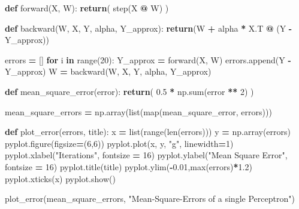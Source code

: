 \documentclass[
]{book}
\newenvironment{Shaded}{\begin{snugshade}}{\end{snugshade}}
\newcommand{\BuiltInTok}[1]{#1}
\newcommand{\ControlFlowTok}[1]{\textcolor[rgb]{0.13,0.29,0.53}{\textbf{#1}}}
\newcommand{\DecValTok}[1]{\textcolor[rgb]{0.00,0.00,0.81}{#1}}
\newcommand{\FloatTok}[1]{\textcolor[rgb]{0.00,0.00,0.81}{#1}}
\newcommand{\KeywordTok}[1]{\textcolor[rgb]{0.13,0.29,0.53}{\textbf{#1}}}
\newcommand{\NormalTok}[1]{#1}
\newcommand{\OperatorTok}[1]{\textcolor[rgb]{0.81,0.36,0.00}{\textbf{#1}}}
\newcommand{\StringTok}[1]{\textcolor[rgb]{0.31,0.60,0.02}{#1}}
\begin{document}
\begin{Shaded}
\begin{Highlighting}[]
\KeywordTok{def}\NormalTok{ forward(X, W):}
  \ControlFlowTok{return}\NormalTok{( step(X }\OperatorTok{@}\NormalTok{ W) )}

\KeywordTok{def}\NormalTok{ backward(W, X, Y, alpha, Y\_approx):}
    \ControlFlowTok{return}\NormalTok{(W }\OperatorTok{+}\NormalTok{ alpha }\OperatorTok{*}\NormalTok{ X.T }\OperatorTok{@}\NormalTok{ (Y }\OperatorTok{{-}}\NormalTok{ Y\_approx))}
  
  
\NormalTok{errors }\OperatorTok{=}\NormalTok{ []}
\ControlFlowTok{for}\NormalTok{ i }\KeywordTok{in} \BuiltInTok{range}\NormalTok{(}\DecValTok{20}\NormalTok{):}
\NormalTok{  Y\_approx }\OperatorTok{=}\NormalTok{ forward(X, W)}
\NormalTok{  errors.append(Y }\OperatorTok{{-}}\NormalTok{ Y\_approx)}
\NormalTok{  W }\OperatorTok{=}\NormalTok{ backward(W, X, Y, alpha, Y\_approx)}
  
  
  
\KeywordTok{def}\NormalTok{ mean\_square\_error(error):}
  \ControlFlowTok{return}\NormalTok{( }\FloatTok{0.5} \OperatorTok{*}\NormalTok{ np.}\BuiltInTok{sum}\NormalTok{(error }\OperatorTok{**} \DecValTok{2}\NormalTok{) )}


\NormalTok{mean\_square\_errors }\OperatorTok{=}\NormalTok{ np.array(}\BuiltInTok{list}\NormalTok{(}\BuiltInTok{map}\NormalTok{(mean\_square\_error, errors)))}


\KeywordTok{def}\NormalTok{ plot\_error(errors, title):}
\NormalTok{  x }\OperatorTok{=} \BuiltInTok{list}\NormalTok{(}\BuiltInTok{range}\NormalTok{(}\BuiltInTok{len}\NormalTok{(errors)))}
\NormalTok{  y }\OperatorTok{=}\NormalTok{ np.array(errors)}
\NormalTok{  pyplot.figure(figsize}\OperatorTok{=}\NormalTok{(}\DecValTok{6}\NormalTok{,}\DecValTok{6}\NormalTok{))}
\NormalTok{  pyplot.plot(x, y, }\StringTok{"g"}\NormalTok{, linewidth}\OperatorTok{=}\DecValTok{1}\NormalTok{)}
\NormalTok{  pyplot.xlabel(}\StringTok{"Iterations"}\NormalTok{, fontsize }\OperatorTok{=} \DecValTok{16}\NormalTok{)}
\NormalTok{  pyplot.ylabel(}\StringTok{"Mean Square Error"}\NormalTok{, fontsize }\OperatorTok{=} \DecValTok{16}\NormalTok{)}
\NormalTok{  pyplot.title(title)}
\NormalTok{  pyplot.ylim(}\OperatorTok{{-}}\FloatTok{0.01}\NormalTok{,}\BuiltInTok{max}\NormalTok{(errors)}\OperatorTok{*}\FloatTok{1.2}\NormalTok{)}
\NormalTok{  pyplot.xticks(x)}
\NormalTok{  pyplot.show()}
  
  
\NormalTok{plot\_error(mean\_square\_errors, }\StringTok{"Mean{-}Square{-}Errors of a single Perceptron"}\NormalTok{)}
\end{Highlighting}
\end{Shaded}


  
\end{document}
